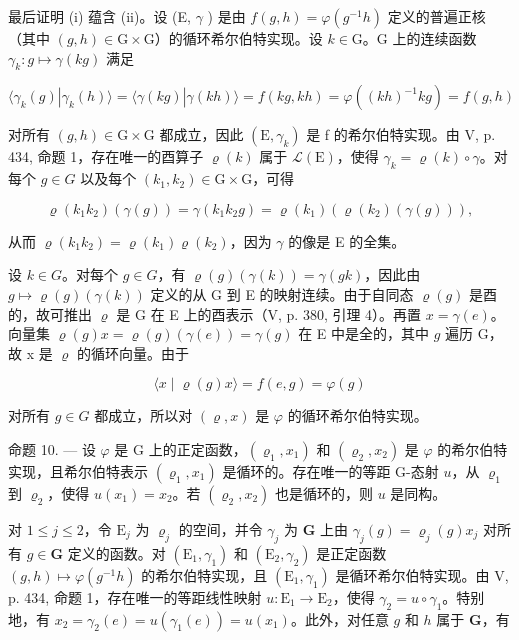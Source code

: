 最后证明 (i) 蕴含 (ii)。设 (E, \(\gamma\) ) 是由 \(f(g,h)=\varphi(g^{-1}h)\) 定义的普遍正核（其中 \((g,h)\in\mathrm{G}\times\mathrm{G}\)）的循环希尔伯特实现。设 \(k\in\mathrm{G}\)。G 上的连续函数 \(\gamma_{k}:g\mapsto\gamma(kg)\) 满足

\[
\langle \gamma_ {k} (g) | \gamma_ {k} (h) \rangle = \langle \gamma (k g) | \gamma (k h) \rangle = f (k g, k h) = \varphi ((k h) ^ {- 1} k g) = f (g, h)
\]

对所有 \((g,h)\in\mathrm{G}\times\mathrm{G}\) 都成立，因此 \((\mathrm{E},\gamma_{k})\) 是 f 的希尔伯特实现。由 V, p. 434, 命题 1，存在唯一的酉算子 \(\varrho(k)\) 属于 \(\mathcal{L}(\mathrm{E})\)，使得 \(\gamma_{k}=\varrho(k)\circ\gamma\)。对每个 \(g\in G\) 以及每个 \((k_{1},k_{2})\in\mathrm{G}\times\mathrm{G}\)，可得

\[
\varrho (k _ {1} k _ {2}) (\gamma (g)) = \gamma (k _ {1} k _ {2} g) = \varrho (k _ {1}) (\varrho (k _ {2}) (\gamma (g))),
\]

从而 \(\varrho(k_1k_2) = \varrho(k_1)\varrho(k_2)\)，因为 \(\gamma\) 的像是 E 的全集。

设 \(k \in G\)。对每个 \(g \in G\)，有 \(\varrho(g)(\gamma(k)) = \gamma(gk)\)，因此由 \(g \mapsto \varrho(g)(\gamma(k))\) 定义的从 G 到 E 的映射连续。由于自同态 \(\varrho(g)\) 是酉的，故可推出 \(\varrho\) 是 G 在 E 上的酉表示（V, p. 380, 引理 4）。再置 \(x = \gamma(e)\)。向量集 \(\varrho(g)x = \varrho(g)(\gamma(e)) = \gamma(g)\) 在 E 中是全的，其中 \(g\) 遍历 G，故 x 是 \(\varrho\) 的循环向量。由于

\[
\langle x \mid \varrho (g) x \rangle = f (e, g) = \varphi (g)
\]

对所有 \(g \in G\) 都成立，所以对 \((\varrho, x)\) 是 \(\varphi\) 的循环希尔伯特实现。

命题 10. — 设 \(\varphi\) 是 G 上的正定函数，\((\varrho_{1}, x_{1})\) 和 \((\varrho_{2}, x_{2})\) 是 \(\varphi\) 的希尔伯特实现，且希尔伯特表示 \((\varrho_{1}, x_{1})\) 是循环的。存在唯一的等距 G-态射 \(u\)，从 \(\varrho_{1}\) 到 \(\varrho_{2}\)，使得 \(u(x_{1}) = x_{2}\)。若 \((\varrho_{2}, x_{2})\) 也是循环的，则 \(u\) 是同构。

对 \(1 \leqslant j \leqslant 2\)，令 \(\mathrm{E}_j\) 为 \(\varrho_j\) 的空间，并令 \(\gamma_j\) 为 \(\mathbf{G}\) 上由 \(\gamma_j(g) = \varrho_j(g)x_j\) 对所有 \(g \in \mathbf{G}\) 定义的函数。对 \((\mathrm{E}_1, \gamma_1)\) 和 \((\mathrm{E}_2, \gamma_2)\) 是正定函数 \((g, h) \mapsto \varphi(g^{-1}h)\) 的希尔伯特实现，且 \((\mathrm{E}_1, \gamma_1)\) 是循环希尔伯特实现。由 V, p. 434, 命题 1，存在唯一的等距线性映射 \(u: \mathrm{E}_1 \to \mathrm{E}_2\)，使得 \(\gamma_2 = u \circ \gamma_1\)。特别地，有 \(x_2 = \gamma_2(e) = u(\gamma_1(e)) = u(x_1)\)。此外，对任意 \(g\) 和 \(h\) 属于 \(\mathbf{G}\)，有

